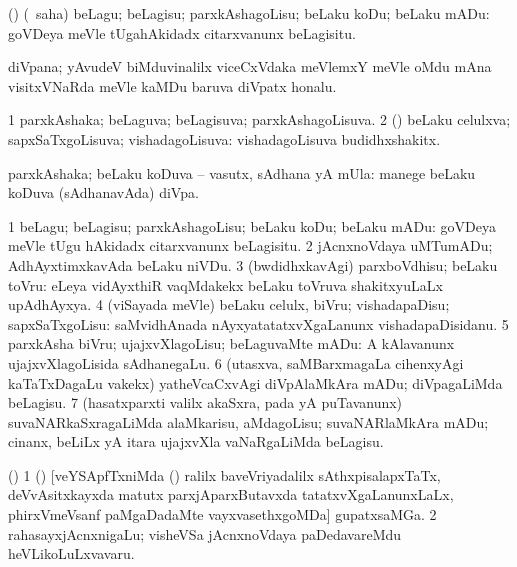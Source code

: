 \bentry
{}
\gl{\sakirx}
\bmng
(\kAparx) (\rUpa\ saha) beLagu; beLagisu; parxkAshagoLisu; beLaku koDu; beLaku mADu:  goVDeya meVle tUgahAkidadx citarxvanunx beLagisitu. 
\emng
\eentry

\bentry
{}
\gl{\nA}
\bmng
diVpana; yAvudeV biMduvinalilx viceCxVdaka meVlemxY meVle oMdu mAna visitxVNaRda meVle kaMDu baruva diVpatx honalu. 
\emng
\eentry

\bentry
{}
\gl{\gu}
\bmng
\bnum
\num{1} parxkAshaka; beLaguva; beLagisuva; parxkAshagoLisuva. 
\num{2} (\rUpa) beLaku celulxva; sapxSaTxgoLisuva; vishadagoLisuva:  vishadagoLisuva budidhxshakitx. 
\enum
\emng
\eentry

\bentry
{}
\gl{\nA}
\bmng
parxkAshaka; beLaku koDuva -- vasutx, sAdhana yA mUla:  manege beLaku koDuva (sAdhanavAda) diVpa. 
\emng
\eentry

\bentry
{}
\gl{\sakirx}
\bmng
\bnum
\num{1} beLagu; beLagisu; parxkAshagoLisu; beLaku koDu; beLaku mADu:  goVDeya meVle tUgu hAkidadx citarxvanunx beLagisitu. 
\num{2} jAcnxnoVdaya uMTumADu; AdhAyxtimxkavAda beLaku niVDu. 
\num{3} (bwdidhxkavAgi) parxboVdhisu; beLaku toVru:  eLeya vidAyxthiR vaqMdakekx beLaku toVruva shakitxyuLaLx upAdhAyxya. 
\num{4} (viSayada meVle) beLaku celulx, biVru; vishadapaDisu; sapxSaTxgoLisu:  saMvidhAnada nAyxyatatatxvXgaLanunx vishadapaDisidanu. 
\num{5} parxkAsha biVru; ujajxvXlagoLisu; beLaguvaMte mADu:  A kAlavanunx ujajxvXlagoLisida sAdhanegaLu. 
\num{6} (utasxva, saMBarxmagaLa cihenxyAgi kaTaTxDagaLu \mo vakekx) yatheVcaCxvAgi diVpAlaMkAra mADu; diVpagaLiMda beLagisu. 
\num{7} (hasatxparxti \mo valilx akaSxra, pada yA puTavanunx) suvaNARkaSxragaLiMda alaMkarisu, aMdagoLisu; suvaNARlaMkAra mADu; cinanx, beLiLx yA itara ujajxvXla vaNaRgaLiMda beLagisu. 
\enum
\emng
\eentry

\bentry
{}
\gl{\nA}
\bmng
(\bava) 
\bnum
\num{1} () [veYSApfTxniMda () ralilx baveVriyadalilx sAthxpisalapxTaTx, deVvAsitxkayxda matutx parxjAparxButavxda tatatxvXgaLanunxLaLx, phirxVmeVsanf paMgaDadaMte vayxvasethxgoMDa] gupatxsaMGa. 
\num{2} rahasayxjAcnxnigaLu; visheVSa jAcnxnoVdaya paDedavareMdu heVLikoLuLxvavaru. 
\enum
\emng
\eentry


